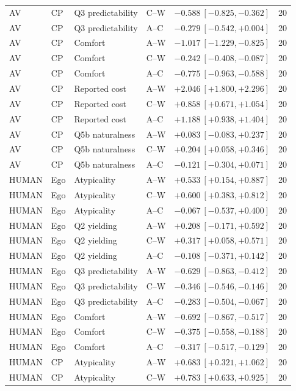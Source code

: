 \begin{longtable}{llllrr}
AV & CP & Q3 predictability & C--W & $-0.588\ [-0.825,-0.362]$ & 20 \\
AV & CP & Q3 predictability & A--C & $-0.279\ [-0.542,+0.004]$ & 20 \\
AV & CP & Comfort & A--W & $-1.017\ [-1.229,-0.825]$ & 20 \\
AV & CP & Comfort & C--W & $-0.242\ [-0.408,-0.087]$ & 20 \\
AV & CP & Comfort & A--C & $-0.775\ [-0.963,-0.588]$ & 20 \\
AV & CP & Reported cost & A--W & $+2.046\ [+1.800,+2.296]$ & 20 \\
AV & CP & Reported cost & C--W & $+0.858\ [+0.671,+1.054]$ & 20 \\
AV & CP & Reported cost & A--C & $+1.188\ [+0.938,+1.404]$ & 20 \\
AV & CP & Q5b naturalness & A--W & $+0.083\ [-0.083,+0.237]$ & 20 \\
AV & CP & Q5b naturalness & C--W & $+0.204\ [+0.058,+0.346]$ & 20 \\
AV & CP & Q5b naturalness & A--C & $-0.121\ [-0.304,+0.071]$ & 20 \\
HUMAN & Ego & Atypicality & A--W & $+0.533\ [+0.154,+0.887]$ & 20 \\
HUMAN & Ego & Atypicality & C--W & $+0.600\ [+0.383,+0.812]$ & 20 \\
HUMAN & Ego & Atypicality & A--C & $-0.067\ [-0.537,+0.400]$ & 20 \\
HUMAN & Ego & Q2 yielding & A--W & $+0.208\ [-0.171,+0.592]$ & 20 \\
HUMAN & Ego & Q2 yielding & C--W & $+0.317\ [+0.058,+0.571]$ & 20 \\
HUMAN & Ego & Q2 yielding & A--C & $-0.108\ [-0.371,+0.142]$ & 20 \\
HUMAN & Ego & Q3 predictability & A--W & $-0.629\ [-0.863,-0.412]$ & 20 \\
HUMAN & Ego & Q3 predictability & C--W & $-0.346\ [-0.546,-0.146]$ & 20 \\
HUMAN & Ego & Q3 predictability & A--C & $-0.283\ [-0.504,-0.067]$ & 20 \\
HUMAN & Ego & Comfort & A--W & $-0.692\ [-0.867,-0.517]$ & 20 \\
HUMAN & Ego & Comfort & C--W & $-0.375\ [-0.558,-0.188]$ & 20 \\
HUMAN & Ego & Comfort & A--C & $-0.317\ [-0.517,-0.129]$ & 20 \\
HUMAN & CP & Atypicality & A--W & $+0.683\ [+0.321,+1.062]$ & 20 \\
HUMAN & CP & Atypicality & C--W & $+0.783\ [+0.633,+0.925]$ & 20 \\

\end{longtable}
